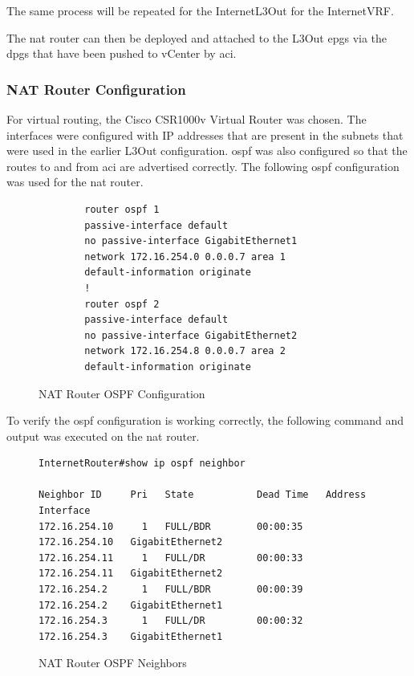 The same process will be repeated for the InternetL3Out for the InternetVRF.

The \gls{nat} router can then be deployed and attached to the L3Out \gls{epg}s via the \gls{dpg}s that have been pushed to vCenter by \gls{aci}.

\subsubsection{NAT Router Configuration}

For virtual routing, the Cisco CSR1000v Virtual Router was chosen. The interfaces were configured with IP addresses that are present in the subnets that were used in the earlier L3Out configuration. \gls{ospf} was also configured so that the routes to and from \gls{aci} are advertised correctly. The following \gls{ospf} configuration was used for the \gls{nat} router.

\begin{figure}[H]
    \begin{verbatim}
        router ospf 1
        passive-interface default
        no passive-interface GigabitEthernet1
        network 172.16.254.0 0.0.0.7 area 1
        default-information originate
        !
        router ospf 2
        passive-interface default
        no passive-interface GigabitEthernet2
        network 172.16.254.8 0.0.0.7 area 2
        default-information originate
    \end{verbatim}
\caption{NAT Router OSPF Configuration}
\label{fig:nat-ospf}
\end{figure}

To verify the \gls{ospf} configuration is working correctly, the following command and output was executed on the \gls{nat} router.

\begin{figure}[H]
    \begin{small}
    \begin{verbatim}
InternetRouter#show ip ospf neighbor

Neighbor ID     Pri   State           Dead Time   Address         Interface
172.16.254.10     1   FULL/BDR        00:00:35    172.16.254.10   GigabitEthernet2
172.16.254.11     1   FULL/DR         00:00:33    172.16.254.11   GigabitEthernet2
172.16.254.2      1   FULL/BDR        00:00:39    172.16.254.2    GigabitEthernet1
172.16.254.3      1   FULL/DR         00:00:32    172.16.254.3    GigabitEthernet1

    \end{verbatim}
\end{small}
\caption{NAT Router OSPF Neighbors}
\label{fig:nat-ospf-db}
\end{figure}

